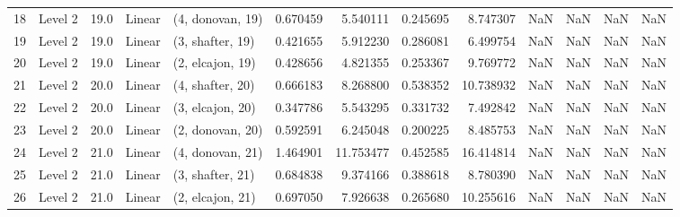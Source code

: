 \begin{tabular}{llrllrrrrrrrr}
18 &   Level 2 &   19.0 &      Linear &  (4, donovan, 19) &   0.670459 &   5.540111 &  0.245695 &   8.747307 &                  NaN &                    NaN &                 NaN &                   NaN \\
19 &   Level 2 &   19.0 &      Linear &  (3, shafter, 19) &   0.421655 &   5.912230 &  0.286081 &   6.499754 &                  NaN &                    NaN &                 NaN &                   NaN \\
20 &   Level 2 &   19.0 &      Linear &  (2, elcajon, 19) &   0.428656 &   4.821355 &  0.253367 &   9.769772 &                  NaN &                    NaN &                 NaN &                   NaN \\
21 &   Level 2 &   20.0 &      Linear &  (4, shafter, 20) &   0.666183 &   8.268800 &  0.538352 &  10.738932 &                  NaN &                    NaN &                 NaN &                   NaN \\
22 &   Level 2 &   20.0 &      Linear &  (3, elcajon, 20) &   0.347786 &   5.543295 &  0.331732 &   7.492842 &                  NaN &                    NaN &                 NaN &                   NaN \\
23 &   Level 2 &   20.0 &      Linear &  (2, donovan, 20) &   0.592591 &   6.245048 &  0.200225 &   8.485753 &                  NaN &                    NaN &                 NaN &                   NaN \\
24 &   Level 2 &   21.0 &      Linear &  (4, donovan, 21) &   1.464901 &  11.753477 &  0.452585 &  16.414814 &                  NaN &                    NaN &                 NaN &                   NaN \\
25 &   Level 2 &   21.0 &      Linear &  (3, shafter, 21) &   0.684838 &   9.374166 &  0.388618 &   8.780390 &                  NaN &                    NaN &                 NaN &                   NaN \\
26 &   Level 2 &   21.0 &      Linear &  (2, elcajon, 21) &   0.697050 &   7.926638 &  0.265680 &  10.255616 &                  NaN &                    NaN &                 NaN &                   NaN \\
\bottomrule
\end{tabular}

